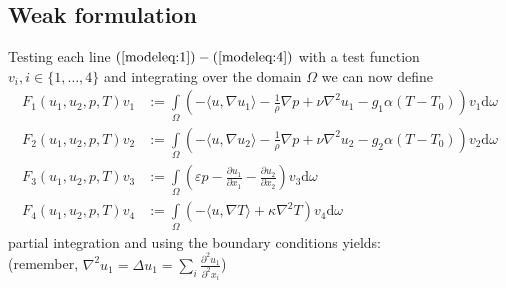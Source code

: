 \documentclass{article}
\begin{document}
 \subsection{Weak formulation}
Testing each line  $(\ref{modeleq:1})-(\ref{modeleq:4})$ with a test function $v_i,i\in \{1,\dots,4\}$ and integrating over the domain $\Omega$ we can now define 
 \begin{align}
F_1(u_1,u_2,p,T)v_1 &:= \int\limits_\Omega \left(-\langle u,\nabla u_1\rangle -\frac{1}{\rho}\nabla p + \nu \nabla^2 u_1 - g_1\alpha (T-T_0)\right)v_1\text{d}\omega \label{F:1}\\
F_2(u_1,u_2,p,T)v_2 &:=\int\limits_\Omega \left(-\langle u,\nabla u_2\rangle  -\frac{1}{\rho}\nabla p + \nu \nabla^2 u_2 - g_2\alpha (T-T_0)\right)v_2\text{d}\omega \label{F:2}\\
F_3(u_1,u_2,p,T)v_3 &:= \int\limits_\Omega\left(\varepsilon p -  \frac{\partial u_1}{\partial x_1} - \frac{\partial u_2}{\partial x_2}\right)v_3\text{d}\omega\label{F:3}\\
F_4(u_1,u_2,p,T)v_4 &:=\int\limits_\Omega \left(-\langle u,\nabla T\rangle+ \kappa \nabla^2 T\right)v_4 \text{d}\omega\label{F:4}
 \end{align}
 partial integration and using the boundary conditions yields: \\(remember, $\nabla^2 u_1 = \Delta u_1 = \sum\limits_i \frac{\partial^2 u_1}{\partial^2 x_i}$)
\end{document}
